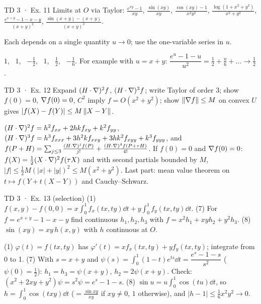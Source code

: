\begin{problem}{TD 3 · Ex. 11}
Limits at $O$ via Taylor: $\frac{e^{xy}-1}{xy}$, $\frac{\sin(xy)}{xy}$,
$\frac{\cos(xy)-1}{x^2y^2}$, $\frac{\log(1+x^2+y^2)}{x^2+y^2}$,
$\frac{e^{x+y}-1-x-y}{(x+y)^2}$, $\frac{\sin(x+y)-(x+y)}{(x+y)^3}$.
\end{problem}
\begin{hint}Each depends on a single quantity $u\to0$; use the one-variable series in $u$.\end{hint}
\begin{solution}
$1$, \ $1$, \ $-\tfrac12$, \ $1$, \ $\tfrac12$, \ $-\tfrac16$. For example with $u=x+y$:
$\dfrac{e^u-1-u}{u^2}=\tfrac12+\tfrac u6+\dots\to\tfrac12$.
\end{solution}

\begin{problem}{TD 3 · Ex. 12}
Expand $(H\cdot\nabla)^2f$, $(H\cdot\nabla)^3f$; write Taylor of order 3; show $f(0)=0$,
$\nabla f(0)=0$, $C^2$ imply $f=O(x^2+y^2)$; show $\left\lVert \nabla f\right\rVert\le M$ on convex $U$ gives
$|f(X)-f(Y)|\le M\left\lVert X-Y\right\rVert$.
\end{problem}
\begin{solution}
$(H\cdot\nabla)^2f=h^2f_{xx}+2hkf_{xy}+k^2f_{yy}$, \
$(H\cdot\nabla)^3f=h^3f_{xxx}+3h^2kf_{xxy}+3hk^2f_{xyy}+k^3f_{yyy}$, and
$f(P+H)=\sum_{j\le3}\frac{(H\cdot\nabla)^jf(P)}{j!}+\frac{(H\cdot\nabla)^4f(P+\tau H)}{4!}$.
If $f(0)=0$ and $\nabla f(0)=0$: $f(X)=\tfrac12(X\cdot\nabla)^2f(\tau X)$ and with second partials
bounded by $M$, $|f|\le\tfrac12M(|x|+|y|)^2\le M(x^2+y^2)$. Last part: mean value theorem on
$t\mapsto f(Y+t(X-Y))$ and Cauchy--Schwarz.
\end{solution}

\begin{problem}{TD 3 · Ex. 13 (selection)}
(1) $f(x,y)-f(0,0)=x\int_0^1f_x(tx,ty)\dd t+y\int_0^1f_y(tx,ty)\dd t$.
(7) For $f=e^{x+y}-1-x-y$ find continuous $h_1,h_2,h_3$ with $f=x^2h_1+xyh_2+y^2h_3$.
(8) $\sin(xy)=xy\,h(x,y)$ with $h$ continuous at $O$.
\end{problem}
\begin{solution}
(1) $\varphi(t)=f(tx,ty)$ has $\varphi'(t)=xf_x(tx,ty)+yf_y(tx,ty)$; integrate from 0 to 1.
(7) With $s=x+y$ and $\psi(s)=\int_0^1(1-t)e^{ts}\dd t=\dfrac{e^s-1-s}{s^2}$ ($\psi(0)=\tfrac12$):
$h_1=h_3=\psi(x+y)$, $h_2=2\psi(x+y)$. Check: $(x^2+2xy+y^2)\psi=s^2\psi=e^s-1-s$.
(8) $\sin u=u\int_0^1\cos(tu)\dd t$, so $h=\int_0^1\cos(txy)\dd t$ ($=\frac{\sin xy}{xy}$ if $xy\ne0$,
$1$ otherwise), and $|h-1|\le\tfrac16x^2y^2\to0$.
\end{solution}

